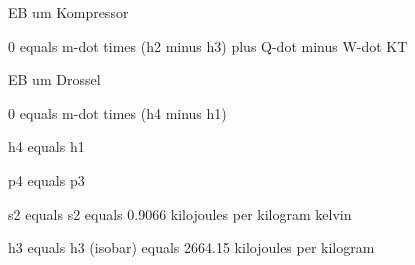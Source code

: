 EB um Kompressor

0 equals m-dot times (h2 minus h3) plus Q-dot minus W-dot KT

EB um Drossel

0 equals m-dot times (h4 minus h1)

h4 equals h1

p4 equals p3

s2 equals s2 equals 0.9066 kilojoules per kilogram kelvin

h3 equals h3 (isobar) equals 2664.15 kilojoules per kilogram